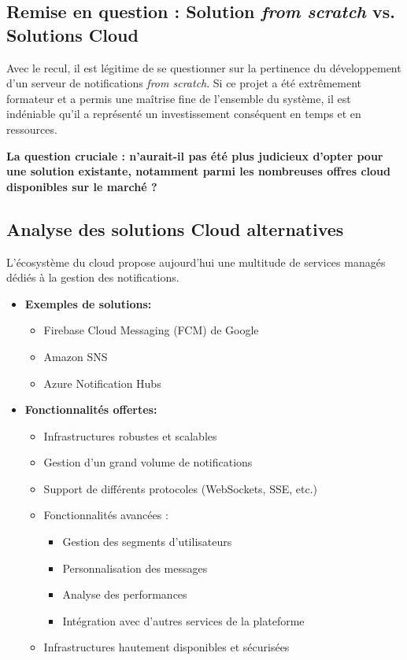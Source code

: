 \subsection{Remise en question : Solution {\it from scratch} vs. Solutions Cloud}

Avec le recul, il est légitime de se questionner sur la pertinence du
développement d'un serveur de notifications {\it from scratch}.  Si ce projet a été
extrêmement formateur et a permis une maîtrise fine de l'ensemble du système,
il est indéniable qu'il a représenté un investissement conséquent en temps et
en ressources.

{\bf La question cruciale : n'aurait-il pas été plus judicieux d'opter pour une solution existante, notamment parmi les nombreuses offres cloud disponibles sur le marché ?}

\subsection{Analyse des solutions Cloud alternatives}

L'écosystème du cloud propose aujourd'hui une multitude de services managés dédiés à la gestion des notifications.

\begin{itemize}
\item {\bf Exemples de solutions:}
	\begin{itemize}
    \item Firebase Cloud Messaging (FCM) de Google
    \item Amazon SNS
    \item Azure Notification Hubs
	\end{itemize}

\item {\bf Fonctionnalités offertes:}
	\begin{itemize}
    \item Infrastructures robustes et scalables
    \item Gestion d'un grand volume de notifications
    \item Support de différents protocoles (WebSockets, SSE, etc.)
    \item Fonctionnalités avancées :
		\begin{itemize}
        \item Gestion des segments d'utilisateurs
        \item Personnalisation des messages
        \item Analyse des performances
        \item Intégration avec d'autres services de la plateforme
		\end{itemize}
    \item Infrastructures hautement disponibles et sécurisées
	\end{itemize}
\end{itemize}

